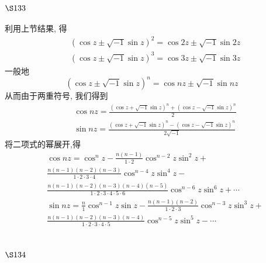 \section{$\S 133$}

利用上节结果, 得
\[
\begin{aligned}
& (\cos z \pm \sqrt{-1} \sin z)^{2}=\cos 2 z \pm \sqrt{-1} \sin 2 z \\
& (\cos z \pm \sqrt{-1} \sin z)^{3}=\cos 3 z \pm \sqrt{-1} \sin 3 z
\end{aligned}
\]
一般地
\[
(\cos z \pm \sqrt{-1} \sin z)^{n}=\cos n z \pm \sqrt{-1} \sin n z
\]
从而由于两重符号, 我们得到
\[
\begin{aligned}
& \cos n z=\frac{(\cos z+\sqrt{-1} \sin z)^{n}+(\cos z-\sqrt{-1} \sin z)^{n}}{2} \\
& \sin n z=\frac{(\cos z+\sqrt{-1} \sin z)^{n}-(\cos z-\sqrt{-1} \sin z)^{n}}{2 \sqrt{-1}}
\end{aligned}
\]
将二项式的幂展开,得
\[
\begin{aligned}
& \cos n z= \cos ^{n} z-\frac{n(n-1)}{1 \cdot 2} \cos ^{n-2} z \sin ^{2} z+ \\
& \frac{n(n-1)(n-2)(n-3)}{1 \cdot 2 \cdot 3 \cdot 4} \cos ^{n-4} z \sin ^{4} z- \\
& \frac{n(n-1)(n-2)(n-3)(n-4)(n-5)}{1 \cdot 2 \cdot 3 \cdot 4 \cdot 5 \cdot 6} \cos ^{n-6} z \sin ^{6} z+\cdots \\
& \sin n z= \frac{n}{1} \cos ^{n-1} z \sin z-\frac{n(n-1)(n-2)}{1 \cdot 2 \cdot 3} \cos ^{n-3} z \sin ^{3} z+ \\
& \frac{n(n-1)(n-2)(n-3)(n-4)}{1 \cdot 2 \cdot 3 \cdot 4 \cdot 5} \cos ^{n-5} z \sin ^{5} z-\cdots
\end{aligned}
\]
\section{$\S 134$}

